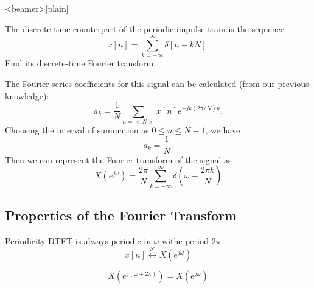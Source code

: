 \begin{frame}<beamer>[plain]
    \begin{figure}
        \centering
        
    \end{figure}
	
\end{frame}

\begin{frame}
	\begin{example}
		The discrete-time counterpart of the periodic impulse train is the sequence
		\begin{equation*}
			x[n] = \sum_{k=-\infty}^{\infty}\delta[n-kN].
		\end{equation*}
		Find its discrete-time Fourier transform.
	\end{example}

	{
		The Fourier series coefficients for this signal can be calculated (from our previous knowledge):
		\begin{equation*}
			a_k = \frac{1}{N}\sum_{n=<N>}x[n]e^{-jk(2\pi/N)n}.
		\end{equation*}
		\pause
		Choosing the interval of summation as $0 \leq n \leq N-1$, we have
		\begin{equation}
			a_k = \frac{1}{N}.
		\end{equation}
		\pause
		Then we can represent the Fourier transform of the signal as
		\begin{equation*}
			X(e^{j\omega}) = \frac{2\pi}{N}\sum_{k=-\infty}^{\infty}\delta\left(\omega - \frac{2\pi k}{N} \right)
		\end{equation*}
	}
\end{frame}

\subsection{Properties of the Fourier Transform}

\begin{frame}{Periodicity}
    DTFT is always periodic in $\omega$ withe period $2\pi$
    \begin{equation*}
        x[n] \overset{\mathcal{F}}{\leftrightarrow} X(e^{j\omega})
    \end{equation*}

    \begin{equation*}
        X\left(e^{j(\omega+2\pi)}\right) = X(e^{j\omega})
    \end{equation*}
\end{frame}


